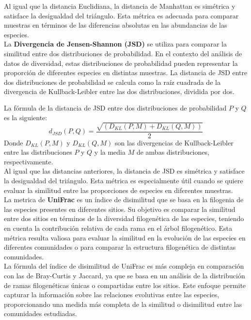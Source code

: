 Al igual que la distancia Euclidiana, la distancia de Manhattan es simétrica y satisface la desigualdad del triángulo. Esta métrica es adecuada para comparar muestras en términos de las diferencias absolutas en las abundancias de las especies.\\

La \textbf{Divergencia de Jensen-Shannon (JSD)} se utiliza para comparar la similitud entre dos distribuciones de probabilidad. En el contexto del análisis de datos de diversidad, estas distribuciones de probabilidad pueden representar la proporción de diferentes especies en distintas muestras. La distancia de JSD entre dos distribuciones de probabilidad se calcula como la raíz cuadrada de la divergencia de Kullback-Leibler entre las dos distribuciones, dividida por dos. 

La fórmula de la distancia de JSD entre dos distribuciones de probabilidad $P$ y $Q$ es la siguiente:
$$d_{JSD}(P, Q) = \frac{\sqrt{(D_{KL}(P, M) + D_{KL}(Q, M))}}{2}$$
Donde $D_{KL}(P, M)$ y $D_{KL}(Q, M)$ son las divergencias de Kullback-Leibler entre las distribuciones $P$ y $Q$ y la media $M$ de ambas distribuciones, respectivamente. \\

Al igual que las distancias anteriores, la distancia de JSD es simétrica y satisface la desigualdad del triángulo. Esta métrica es especialmente útil cuando se quiere evaluar la similitud entre las proporciones de especies en diferentes muestras.\\

La metrica de \textbf{UniFrac} es un índice de disimilitud que se basa en la filogenia de las especies presentes en diferentes sitios. Su objetivo es comparar la similitud entre dos sitios en términos de la diversidad filogenética de las especies, teniendo en cuenta la contribución relativa de cada rama en el árbol filogenético. Esta métrica resulta valiosa para evaluar la similitud en la evolución de las especies en diferentes comunidades o para comparar la estructura filogenética de distintas comunidades.\\

La fórmula del índice de disimilitud de UniFrac es más compleja en comparación con las de Bray-Curtis y Jaccard, ya que se basa en un análisis de la distribución de ramas filogenéticas únicas o compartidas entre los sitios. Este enfoque permite capturar la información sobre las relaciones evolutivas entre las especies, proporcionando una medida más completa de la similitud o disimilitud entre las comunidades estudiadas. \\


